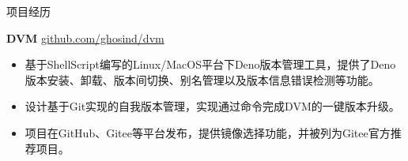 \documentclass{resume} %
\begin{document}
\begin{rSection}{项目经历}
  \item \textbf{DVM} {} \hfill \href{https://github.com/ghosind/dvm}{github.com/ghosind/dvm}
  \begin{itemize}
    \itemsep -3pt {}
    \item 基于ShellScript编写的Linux/MacOS平台下Deno版本管理工具，提供了Deno版本安装、卸载、版本间切换、别名管理以及版本信息错误检测等功能。
    \item 设计基于Git实现的自我版本管理，实现通过命令完成DVM的一键版本升级。
    \item 项目在GitHub、Gitee等平台发布，提供镜像选择功能，并被列为Gitee官方推荐项目。
  \end{itemize}

\end{rSection}
\end{document}
